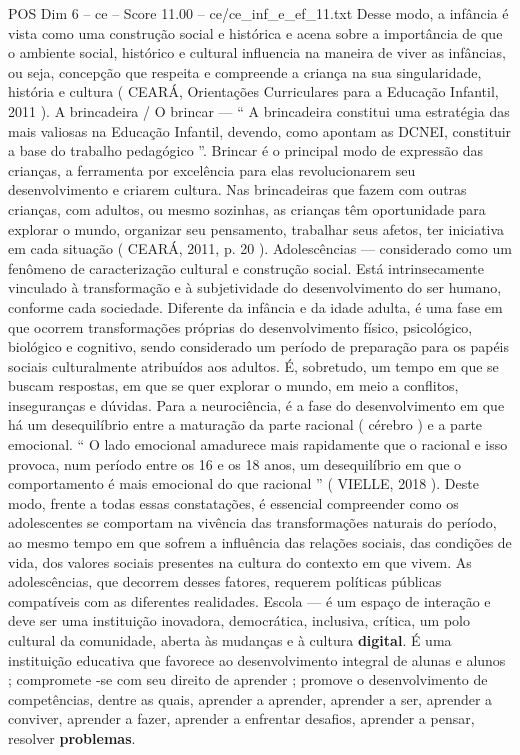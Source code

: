 \begin{textsample}{POS Dim 6 – ce – Score 11.00 – ce/ce\_inf\_e\_ef\_11.txt}
Desse modo, a infância é vista como uma construção social e histórica e acena sobre a importância de que o ambiente social, histórico e cultural influencia na maneira de viver as infâncias, ou seja, concepção que respeita e compreende a criança na sua singularidade, história e cultura ( CEARÁ, Orientações Curriculares para a Educação Infantil, 2011 ).
A brincadeira / O brincar — “ A brincadeira constitui uma estratégia das mais valiosas na Educação Infantil, devendo, como apontam as DCNEI, constituir a base do trabalho pedagógico ”.
Brincar é o principal modo de expressão das crianças, a ferramenta por excelência para elas revolucionarem seu desenvolvimento e criarem cultura.
Nas brincadeiras que fazem com outras crianças, com adultos, ou mesmo sozinhas, as crianças têm oportunidade para explorar o mundo, organizar seu pensamento, trabalhar seus afetos, ter iniciativa em cada situação ( CEARÁ, 2011, p. 20 ).
Adolescências — considerado como um fenômeno de caracterização cultural e construção social.
Está intrinsecamente vinculado à transformação e à subjetividade do desenvolvimento do ser humano, conforme cada sociedade.
Diferente da infância e da idade adulta, é uma fase em que ocorrem transformações próprias do desenvolvimento físico, psicológico, biológico e cognitivo, sendo considerado um período de preparação para os papéis sociais culturalmente atribuídos aos adultos.
É, sobretudo, um tempo em que se buscam respostas, em que se quer explorar o mundo, em meio a conflitos, inseguranças e dúvidas.
Para a neurociência, é a fase do desenvolvimento em que há um desequilíbrio entre a maturação da parte racional ( cérebro ) e a parte emocional. “ O lado emocional amadurece mais rapidamente que o racional e isso provoca, num período entre os 16 e os 18 anos, um desequilíbrio em que o comportamento é mais emocional do que racional ” ( VIELLE, 2018 ).
Deste modo, frente a todas essas constatações, é essencial compreender como os adolescentes se comportam na vivência das transformações naturais do período, ao mesmo tempo em que sofrem a influência das relações sociais, das condições de vida, dos valores sociais presentes na cultura do contexto em que vivem.
As adolescências, que decorrem desses fatores, requerem políticas públicas compatíveis com as diferentes realidades.
Escola — é um espaço de interação e deve ser uma instituição inovadora, democrática, inclusiva, crítica, um polo cultural da comunidade, aberta às mudanças e à cultura \textbf{digital}.
É uma instituição educativa que favorece ao desenvolvimento integral de alunas e alunos ; compromete -se com seu direito de aprender ; promove o desenvolvimento de competências, dentre as quais, aprender a aprender, aprender a ser, aprender a conviver, aprender a fazer, aprender a enfrentar desafios, aprender a pensar, resolver \textbf{problemas}.

\end{textsample}
